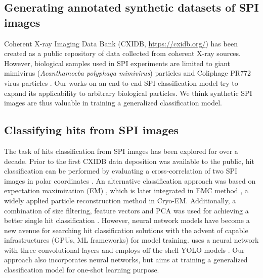\subsection{Generating annotated synthetic datasets of SPI images}


Coherent X-ray Imaging Data Bank (CXIDB, \url{https://cxidb.org/})
\cite{maiaCoherentXrayImaging2012} has been created as a public repository of
data collected from coherent X-ray sources.  However, biological samples used in
SPI experiments are limited to giant mimivirus (\textit{Acanthamoeba polyphaga
mimivirus}) particles \cite{ekebergThreeDimensionalReconstructionGiant2015} and
Coliphage PR772 virus particles \cite{reddyCoherentSoftXray2017a,
liDiffractionDataAerosolized2020a}. Our works on an end-to-end SPI
classification model try to expand its applicability to arbitrary biological
particles.  We think synthetic SPI images are thus valuable in training a
generalized classification model.  



\subsection{Classifying hits from SPI images}

The task of hits classification from SPI images has been explored for over a
decade. Prior to the first CXIDB data deposition
\cite{seibertSingleMimivirusParticles2011a} was available to the public, hit
classification can be performed by evaluating a cross-correlation of two SPI
images in polar coordinates \cite{bortelClassificationAveragingRandom2009}.  An
alternative classification approach was based on expectation maximization (EM)
\cite{dempsterMaximumLikelihoodIncomplete1977}, which is later integrated in EMC
method \cite{lohReconstructionAlgorithmSingleparticle2009}, a widely applied
particle reconstruction method in Cryo-EM.  Additionally, a combination of size
filtering, feature vectors and PCA was used for achieving a better single hit
classification \cite{bobkovSortingAlgorithmsSingleparticle2015}.  However,
neural network models have become a new avenue for searching hit classification
solutions with the advent of capable infrastructures (GPUs, ML frameworks) for
model training. \cite{shiEvaluationPerformanceClassification2019} uses a neural
network with three convolutional layers and
\cite{ignatenkoClassificationDiffractionPatterns2021} employs off-the-shell YOLO
models \cite{redmonYOLO9000BetterFaster2016, redmonYOLOv3IncrementalImprovement2018}.  
Our approach also incorporates neural networks, but aims at training a
generalized classification model for one-shot learning purpose.  


